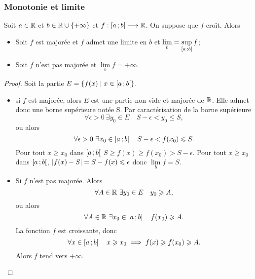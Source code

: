 \subsubsection{Monotonie et limite}

\begin{theo}
  Soit $a \in \mathbb{R}$ et $b \in \mathbb{R}\cup\{+\infty\}$ et $f : \left[ a \, ;  b \right[ \longrightarrow \mathbb{R}$. On suppose que $f$ croît. Alors
  \begin{itemize}
  \item Soit $f$ est majorée et $f$ admet une limite en $b$ et $\lim\limits_{b} = \sup\limits_{\left[ a \, ;  b \right]}f$;
  \item Soit $f$ n'est pas majorée et $\lim\limits_{b}f=+\infty$.
  \end{itemize}
\end{theo}
\begin{proof}
  Soit la partie $E=\left\{f(x)\mathrel{}\middle|\mathrel{}x \in \left[ a \, ;  b \right[\right\}$.
  \begin{itemize}
  \item si $f$ est majorée, alors $E$ est une partie non vide et majorée de $\mathbb{R}$. Elle admet donc une borne supérieure notée S. Par caractérisation de la borne supérieure
    \begin{equation}
      \forall \epsilon >0 \ \exists y_0 \in E \quad S-\epsilon <y_0 \leqslant S,
    \end{equation}
    ou alors
    \begin{equation}
      \forall \epsilon >0 \ \exists x_0 \in \left[ a \, ;  b \right[ \quad S-\epsilon <f(x_0) \leqslant S.
    \end{equation}
    Pour tout $x \geqslant x_0$ dans $\left[ a \, ;  b \right[$ $S \geqslant f(x) \geqslant f(x_0) > S-\epsilon$. Pour tout $x \geqslant x_0$ dans $\left[ a \, ;  b \right[$, $\left\lvert f(x)-S\right\rvert=S-f(x) \leqslant \epsilon$ donc $\lim\limits_{b} f =S$.
  \item Si $f$ n'est pas majorée. Alors
    \begin{equation}
      \forall A \in \R \ \exists y_0 \in E \quad y_0 \geqslant A,
    \end{equation}
    ou alors
    \begin{equation}
      \forall A \in \mathbb{R} \ \exists x_0 \in \left[ a \, ;  b \right[ \quad f(x_0) \geqslant A.
    \end{equation}
    La fonction $f$ est croissante, donc
    \begin{equation}
      \forall x \in \left[ a \, ;  b \right[ \quad x \geqslant x_0 \implies f(x) \geqslant f(x_0) \geqslant A.
    \end{equation}
    Alors $f$ tend vers $+\infty$.
  \end{itemize}
\end{proof}

